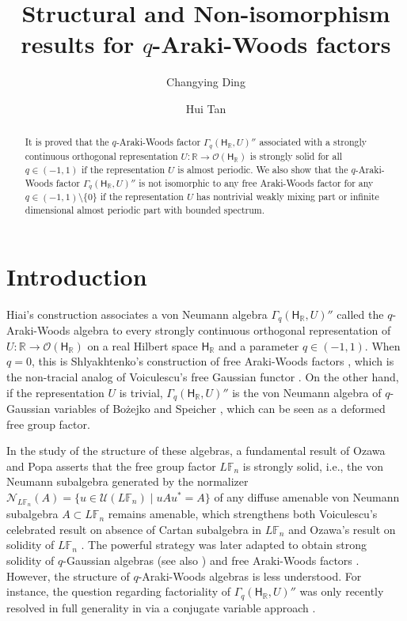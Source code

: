 \documentclass[a4paper,11pt]{amsart}
\title{Structural and Non-isomorphism results for $q$-Araki-Woods factors}
\author{Changying Ding}
\author{Hui Tan}
\theoremstyle{definition}
\newcommand{\F}{{\mathbb F}}
\newcommand{\R}{{\mathbb R}}
\newcommand{\cN}{{\mathcal N}}
\newcommand{\cO}{{\mathcal O}}
\newcommand{\cU}{{\mathcal U}}
\newcommand{\sH}{\mathsf{H}}
\begin{document}
%

\begin{abstract}
It is proved that the $q$-Araki-Woods factor $\Gamma_q(\sH_\R, U)''$ associated with a strongly continuous orthogonal representation 
	$U:\R\to \cO(\sH_\R)$ is strongly solid for all $q\in (-1,1)$
	if the representation $U$ is almost periodic.
We also show that the $q$-Araki-Woods factor $\Gamma_q(\sH_\R, U)''$ 
	is not isomorphic to any free Araki-Woods factor for any $q\in (-1,1)\setminus\{0\}$
	if the representation $U$ has nontrivial weakly mixing part or infinite dimensional almost periodic part with bounded spectrum.
\end{abstract}
\maketitle

\section{Introduction}

Hiai's construction \cite{Hia03} associates a von Neumann algebra $\Gamma_q(\sH_\R, U)''$ called the $q$-Araki-Woods algebra
	to every strongly continuous orthogonal representation of $U:\R\to \cO(\sH_\R)$ on a real Hilbert space $\sH_\R$
	and a parameter $q\in (-1,1)$.
When $q=0$, this is Shlyakhtenko's construction of free Araki-Woods factors \cite{Sh97},
	which is the non-tracial analog of Voiculescu's free Gaussian functor \cite{VDN92}.
On the other hand, if the representation $U$ is trivial, $\Gamma_q(\sH_\R, U)''$
	is the von Neumann algebra of $q$-Gaussian variables of Bo\.zejko and Speicher \cite{BS91},
	which can be seen as a deformed free group factor.
	
In the study of the structure of these algebras, a fundamental result of Ozawa and Popa \cite{OzPo10a}
	asserts that the free group factor $L\F_n$ is strongly solid, i.e.,
	the von Neumann subalgebra generated by the normalizer $\cN_{L\F_n}(A)=\{u\in \cU(L\F_n)\mid uA u^*=A\}$ of
	any diffuse amenable von Neumann subalgebra $A\subset L\F_n$
	remains amenable, which strengthens both Voiculescu's celebrated result on absence of Cartan subalgebra in $L\F_n$ \cite{Voi96} 
	and Ozawa's result on solidity of $L\F_n$ \cite{Oza04}. 
The powerful strategy was later adapted to obtain strong solidity of $q$-Gaussian algebras \cite{Av11}
	(see also \cite{CaIsWa21, DP23})
	and free Araki-Woods factors \cite{BHV18}.
However, the structure of $q$-Araki-Woods algebras is less understood.
For instance, the question regarding factoriality of $\Gamma_q(\sH_\R, U)''$ was only recently resolved in full generality in \cite{KSW23}
	via a conjugate variable approach \cite{MiSp23, Nel17}. 
\end{document}
